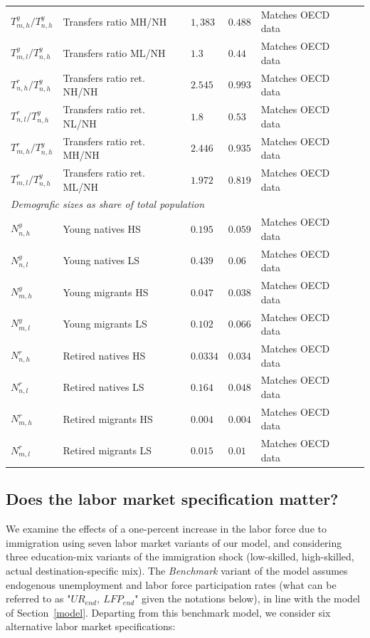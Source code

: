 \documentclass[a4paper,12pt]{article}
\begin{document}
\begin{table}[htb!]
\begin{tabular}{llllll}
$T^y_{m,h}/T^y_{n,h}$ & Transfers ratio MH/NH & $1,383$& $0.488$ & Matches OECD data\\
$T^y_{m,l}/T^y_{n,h}$ & Transfers ratio ML/NH& $1.3$ & $0.44$ & Matches OECD data\\
$T^r_{n,h}/T^y_{n,h}$ & Transfers ratio ret. NH/NH& $2.545$ & $0.993$ & Matches OECD data\\
$T^r_{n,l}/T^y_{n,h}$ & Transfers ratio ret. NL/NH& $1.8$ & $0.53$ & Matches OECD data\\
$T^r_{m,h}/T^y_{n,h}$ & Transfers ratio ret. MH/NH& $2.446$& $0.935$ & Matches OECD data\\
$T^r_{m,l}/T^y_{n,h}$ & Transfers ratio ret. ML/NH & $1.972$ & $0.819$ & Matches OECD data\\
\hline
\multicolumn{5}{l}{\textit{Demografic sizes as share of total population}} \\ \hline
$N^y_{n,h}$ & Young natives HS &$0.195$ &$0.059$ & Matches OECD data\\
$N^y_{n,l}$ & Young natives LS &$0.439$ &$0.06$ & Matches OECD data\\
$N^y_{m,h}$ & Young migrants HS & $0.047$&$0.038$ & Matches OECD data\\
$N^y_{m,l}$ & Young migrants LS &$0.102$ &$0.066$ & Matches OECD data\\
$N^r_{n,h}$ & Retired natives HS & $0.0334$&$0.034$ & Matches OECD data\\
$N^r_{n,l}$ & Retired natives LS & $0.164$&$0.048$ & Matches OECD data\\
$N^r_{m,h}$ & Retired migrants HS & $0.004$&$0.004$ & Matches OECD data\\
$N^r_{m,l}$ & Retired migrants LS & $0.015$&$0.01$ & Matches OECD data
\\ \hline\hline
\end{tabular}
\end{table}


\subsection{Does the labor market specification matter? \label{sensitivity_to_labor_market}}

We examine the effects of a one-percent increase in the labor force due to immigration using seven labor market variants of our model, and considering three education-mix variants of the immigration shock (low-skilled, high-skilled, actual destination-specific mix). The \textit{Benchmark} variant of the model assumes endogenous unemployment and labor force participation rates (what can be referred to as "$UR_{end},~LFP_{end}$" given the notations below), in line with the model of Section~\ref{model}. Departing from this benchmark model, we consider six alternative labor market specifications:
\end{document}
